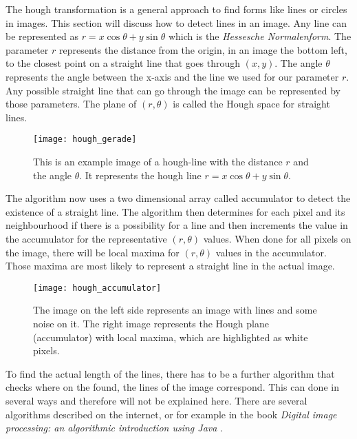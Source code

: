 The hough transformation is a general approach to find forms like lines or circles in images. This section will discuss how to detect lines in an image.
Any line can be represented as $r = x \cos \theta + y \sin \theta$ which is the \textit{Hessesche Normalenform}. The parameter $r$ represents the distance from the origin, in an image the bottom left, to the closest point on a straight line that goes through $(x,y)$. The angle $\theta$ represents the angle between the x-axis and the line we used for our parameter $r$. Any possible straight line that can go through the image can be represented by those parameters. The plane of $(r,\theta)$ is called the Hough space for straight lines.

\begin{figure}[H]
	\centering
	\texttt{[image: hough\_gerade]}
	\caption{This is an example image of a hough-line with the distance $r$ and the angle $\theta$. It represents the hough line $r = x \cos \theta + y \sin \theta$.}
	\label{fig:hough_line}
\end{figure}

The algorithm now uses a two dimensional array called accumulator to detect the existence of a straight line. The algorithm then determines for each pixel and its neighbourhood if there is a possibility for a line and then increments the value in the accumulator for the representative $(r,\theta)$ values. When done for all pixels on the image, there will be local maxima for $(r,\theta)$ values in the accumulator. Those maxima are most likely to represent a straight line in the actual image.  

\begin{figure}[H]
	\centering
	\texttt{[image: hough\_accumulator]}
	\caption{The image on the left side represents an image with lines and some noise on it. The right image represents the Hough plane (accumulator) with local maxima, which are highlighted as white pixels.}
	\label{fig:hough_accumulator}
\end{figure}

To find the actual length of the lines, there has to be a further algorithm that checks where on the found, the lines of the image correspond. This can done in several ways and therefore will not be explained here. There are several algorithms described on the internet, or for example in the book \textit{Digital image processing: an algorithmic introduction using Java} \citep{burger_burge_2016}.

\pagebreak

